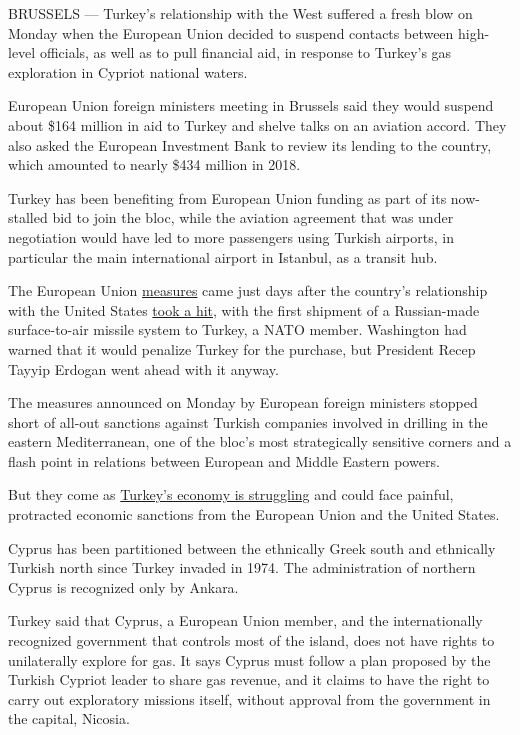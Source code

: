 BRUSSELS --- Turkey's relationship with the West suffered a fresh blow
on Monday when the European Union decided to suspend contacts between
high-level officials, as well as to pull financial aid, in response to
Turkey's gas exploration in Cypriot national waters.

European Union foreign ministers meeting in Brussels said they would
suspend about \$164 million in aid to Turkey and shelve talks on an
aviation accord. They also asked the European Investment Bank to review
its lending to the country, which amounted to nearly \$434 million in
2018.

Turkey has been benefiting from European Union funding as part of its
now-stalled bid to join the bloc, while the aviation agreement that was
under negotiation would have led to more passengers using Turkish
airports, in particular the main international airport in Istanbul, as a
transit hub.

The European Union
\href{https://www.consilium.europa.eu/en/press/press-releases/2019/07/15/turkish-drilling-activities-in-the-eastern-mediterranean-council-adopts-conclusions/}{measures}
came just days after the country's relationship with the United States
\href{https://www.nytimes.com/2019/07/12/world/europe/turkey-russia-missiles.html}{took
a hit}, with the first shipment of a Russian-made surface-to-air missile
system to Turkey, a NATO member. Washington had warned that it would
penalize Turkey for the purchase, but President Recep Tayyip Erdogan
went ahead with it anyway.

The measures announced on Monday by European foreign ministers stopped
short of all-out sanctions against Turkish companies involved in
drilling in the eastern Mediterranean, one of the bloc's most
strategically sensitive corners and a flash point in relations between
European and Middle Eastern powers.

But they come as
\href{https://www.nytimes.com/2019/07/08/business/turkey-economy-crisis.html}{Turkey's
economy is struggling} and could face painful, protracted economic
sanctions from the European Union and the United States.

Cyprus has been partitioned between the ethnically Greek south and
ethnically Turkish north since Turkey invaded in 1974. The
administration of northern Cyprus is recognized only by Ankara.

Turkey said that Cyprus, a European Union member, and the
internationally recognized government that controls most of the island,
does not have rights to unilaterally explore for gas. It says Cyprus
must follow a plan proposed by the Turkish Cypriot leader to share gas
revenue, and it claims to have the right to carry out exploratory
missions itself, without approval from the government in the capital,
Nicosia.

